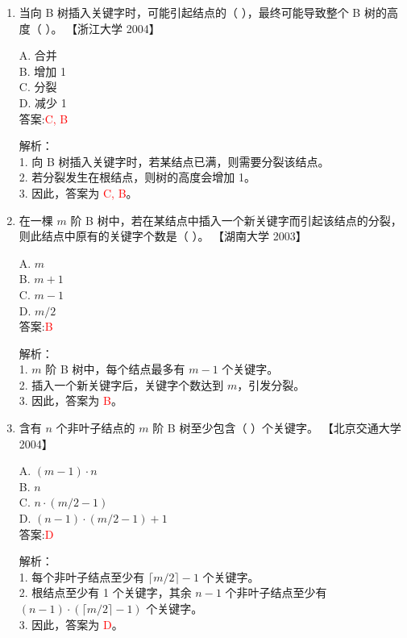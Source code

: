 \documentclass[lang=cn,newtx,10pt,scheme=chinese]{../../../elegantbook}
\begin{document}
\begin{enumerate}
\item 当向 B 树插入关键字时，可能引起结点的（ ），最终可能导致整个 B 树的高度（ ）。  
    【浙江大学 2004】  

    A. 合并 \\  
    B. 增加 1 \\  
    C. 分裂 \\  
    D. 减少 1 \\  

    答案:\textcolor{red}{C, B}

    解析：\\
    1. 向 B 树插入关键字时，若某结点已满，则需要分裂该结点。\\
    2. 若分裂发生在根结点，则树的高度会增加 1。\\
    3. 因此，答案为 \textcolor{red}{C, B}。\\

\item 在一棵 $m$ 阶 B 树中，若在某结点中插入一个新关键字而引起该结点的分裂，则此结点中原有的关键字个数是（ ）。  
    【湖南大学 2003】  

    A. $m$ \\  
    B. $m+1$ \\  
    C. $m-1$ \\  
    D. $m/2$ \\  

    答案:\textcolor{red}{B}

    解析：\\
    1. $m$ 阶 B 树中，每个结点最多有 $m-1$ 个关键字。\\
    2. 插入一个新关键字后，关键字个数达到 $m$，引发分裂。\\
    3. 因此，答案为 \textcolor{red}{B}。\\

\item 含有 $n$ 个非叶子结点的 $m$ 阶 B 树至少包含（ ）个关键字。  
    【北京交通大学 2004】  

    A. $(m-1) \cdot n$ \\  
    B. $n$ \\  
    C. $n \cdot (m/2 - 1)$ \\  
    D. $(n-1) \cdot (m/2 - 1) + 1$ \\  

    答案:\textcolor{red}{D}

    解析：\\
    1. 每个非叶子结点至少有 $\lceil m/2 \rceil - 1$ 个关键字。\\
    2. 根结点至少有 1 个关键字，其余 $n-1$ 个非叶子结点至少有 $(n-1) \cdot (\lceil m/2 \rceil - 1)$ 个关键字。\\
    3. 因此，答案为 \textcolor{red}{D}。\\


\end{enumerate}
\end{document}
